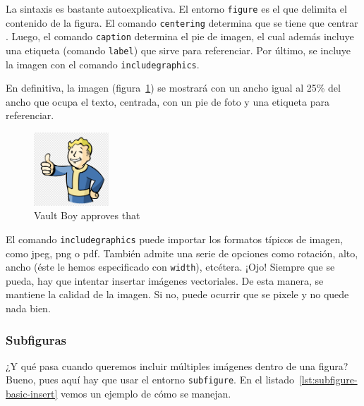 La sintaxis es bastante autoexplicativa. El entorno \texttt{figure} es el que delimita el contenido de la figura. El comando \texttt{centering} determina que se tiene que centrar . Luego, el comando \texttt{caption} determina el pie de imagen, el cual además incluye una etiqueta (comando \texttt{label}) que sirve para referenciar. Por último, se incluye la imagen con el comando \texttt{includegraphics}.

En definitiva, la imagen (figura~\ref{fig:img-vault-boy}) se mostrará con un ancho igual al 25\% del ancho que ocupa el texto, centrada, con un pie de foto y una etiqueta para referenciar.

\begin{figure}[H]
    \centering
    \includegraphics[width=0.25\textwidth]{figures/vault-boy.png}
    \caption{\label{fig:img-vault-boy} Vault Boy approves that}
\end{figure}

El comando \texttt{includegraphics} puede importar los formatos típicos de imagen, como jpeg, png o pdf. También admite una serie de opciones como rotación, alto, ancho (éste le hemos especificado con \texttt{width}), etcétera. ¡Ojo! Siempre que se pueda, hay que intentar insertar imágenes vectoriales. De esta manera, se mantiene la calidad de la imagen. Si no, puede ocurrir que se pixele y no quede nada bien.

\subsubsection{Subfiguras}

¿Y qué pasa cuando queremos incluir múltiples imágenes dentro de una figura? Bueno, pues aquí hay que usar el entorno \texttt{subfigure}. En el listado~\ref{lst:subfigure-basic-insert} vemos un ejemplo de cómo se manejan.

